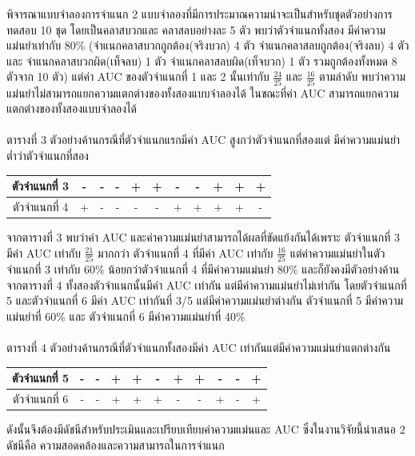\documentclass[twoside, twocolumn, 12pt]{article}
\begin{document}
พิจารณาแบบจำลองการจำแนก 2 แบบจำลองที่มีการประมาณความน่าจะเป็นสำหรับชุดตัวอย่างการทดสอบ 10 ชุด โดยเป็นคลาสบวกและ คลาสลบอย่างละ 5 ตัว พบว่าตัวจำแนกทั้งสอง มีค่าความแม่นยำเท่ากับ 80\% (จำแนกคลาสบวกถูกต้อง(จริงบวก) 4 ตัว จำแนกคลาสลบถูกต้อง(จริงลบ) 4 ตัวและ จำแนกคลาสบวกผิด(เท็จลบ) 1 ตัว จำแนกคลาสลบผิด(เท็จบวก) 1 ตัว รวมถูกต้องทั้งหมด 8 ตัวจาก 10 ตัว) แต่ค่า AUC ของตัวจำแนกที่ 1 และ 2 นั้นเท่ากับ $\frac{24}{25}$ และ $\frac{16}{25}$ ตามลำดับ 
พบว่าความแม่นยำไม่สามารถแยกความแตกต่างของทั้งสองแบบจำลองได้ ในขณะที่ค่า AUC สามารถแยกความแตกต่างของทั้งสองแบบจำลองได้\\\\
ตารางที่ 3 ตัวอย่างค้านกรณีที่ตัวจำแนกแรกมีค่า AUC สูงกว่าตัวจำแนกที่สองแต่ มีค่าความแม่นยำต่ำว่าตัวจำแนกที่สอง
\begin{center}
\begin{tabular}{|c|ccccc|ccccc|}
  \hline
  ตัวจำแนกที่ 3 &-& -& -& +& +& -& -& +& +& +\\
  \hline
  ตัวจำแนกที่ 4 & +& -& -& -& -& +& +& +& +& -\\
  \hline  
\end{tabular}
\end{center}

จากตารางที่ 3 พบว่าค่า AUC และค่าความแม่นยำสามารถได้ผลที่ขัดแย้งกันได้เพราะ ตัวจำแนกที่ 3 มีค่า AUC เท่ากับ $\frac{21}{25}$ มากกว่า ตัวจำแนกที่ 4 ที่มีค่า AUC เท่ากับ $\frac{16}{25}$ แต่ค่าความแม่นยำในตัวจำแนกที่ 3 เท่ากับ 60\% น้อยกว่าตัวจำแนกที่ 4 ที่มีค่าความแม่นยำ 80\% และก็ยังคงมีตัวอย่างค้านจากตารางที่ 4 ทั้งสองตัวจำแนกนั้นมีค่า AUC เท่ากัน แต่มีค่าความแม่นยำไม่เท่ากัน โดยตัวจำแนกที่ 5 และตัวจำแนกที่ 6 มีค่า AUC เท่ากันที่ 3/5 แต่มีค่าความแม่นยำต่างกัน ตัวจำแนกที่ 5 มีค่าความแม่นยำที่ 60\% และ ตัวจำแนกที่ 6 มีค่าความแม่นยำที่ 40\% 
\\\\
ตารางที่ 4 ตัวอย่างค้านกรณีที่ตัวจำแนกทั้งสองมีค่า AUC เท่ากันแต่มีค่าความแม่นยำแตกต่างกัน\begin{center}
\begin{tabular}{|c|ccccc|ccccc|}
  \hline
  ตัวจำแนกที่ 5 & -& -& +& +& -& +& +& -& -& +\\
  \hline
  ตัวจำแนกที่ 6 & -& -& +& +& +& -& -& +& -& +\\
  \hline  
\end{tabular}
\end{center}

ดังนั้นจึงต้องมีดัชนีสำหรับประเมินและเปรียบเทียบค่าความแม่นและ AUC ซึ่งในงานวิจัยนี้นำเสนอ 2 ดัชนีคือ ความสอดคล้องและความสามารถในการจำแนก
\end{document}
